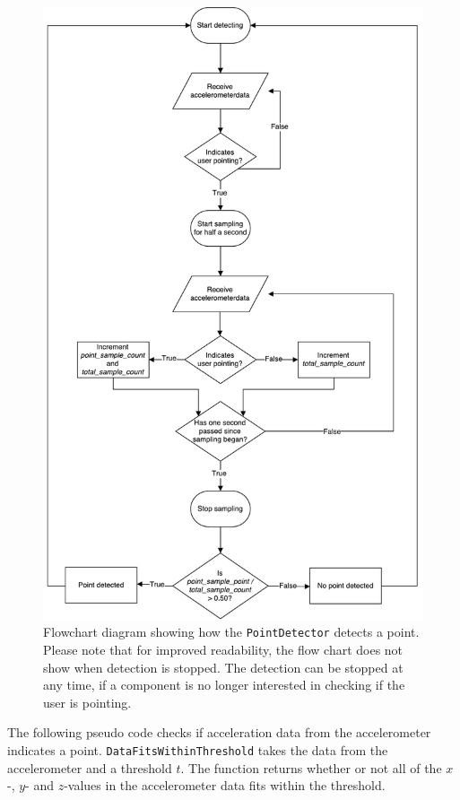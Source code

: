 \begin{figure}
\centering
\includegraphics[height=0.85\textheight]{images/point-detector-flow-chart}
\caption{Flowchart diagram showing how the \texttt{PointDetector} detects a point. Please note that for improved readability, the flow chart does not show when detection is stopped. The detection can be stopped at any time, if a component is no longer interested in checking if the user is pointing.}
\label{fig:pointdetector-flow-chart}
\end{figure}

The following pseudo code checks if acceleration data from the accelerometer indicates a point. 
\texttt{DataFitsWithinThreshold} takes the data from the accelerometer and a threshold $t$. 
The function returns whether or not all of the $x$-, $y$- and $z$-values in the accelerometer data fits within the threshold.

